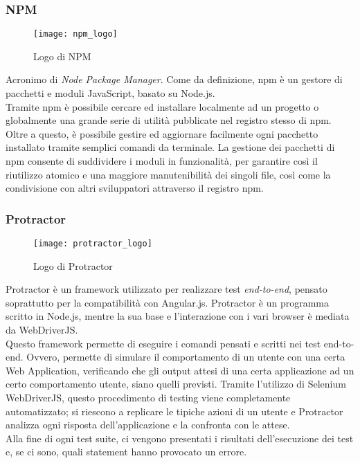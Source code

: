 \subsubsection{NPM}
\begin{figure}[htb] 
    \centering 
    \texttt{[image: npm\_logo]} 
    \caption{Logo di NPM}
\end{figure}
Acronimo di \emph{Node Package Manager}. Come da definizione, npm è un gestore di pacchetti e moduli JavaScript, basato su Node.js.\\ 
Tramite npm è possibile cercare ed installare localmente ad un progetto o globalmente una grande serie di utilità pubblicate nel registro stesso di npm. Oltre a questo, è possibile gestire ed aggiornare facilmente ogni pacchetto installato tramite semplici comandi da terminale.
La gestione dei pacchetti di npm consente di suddividere i moduli in funzionalità, per garantire così il riutilizzo atomico e una maggiore manutenibilità dei singoli file, così come la condivisione con altri sviluppatori attraverso il registro npm. 

\subsubsection{Protractor}
\begin{figure}[htb] 
    \centering 
    \texttt{[image: protractor\_logo]} 
    \caption{Logo di Protractor}
\end{figure}
Protractor è un framework utilizzato per realizzare test \emph{end-to-end}, pensato soprattutto per la compatibilità con Angular.js. Protractor è un programma scritto in Node.js, mentre la sua base e l’interazione con i vari browser è mediata da WebDriverJS.\\
Questo framework permette di eseguire i comandi pensati e scritti nei test end-to-end. Ovvero, permette di simulare il comportamento di un utente con una certa Web Application, verificando che gli output attesi di una certa applicazione ad un certo comportamento utente, siano quelli previsti. Tramite l’utilizzo di Selenium WebDriverJS, questo procedimento di testing viene completamente automatizzato; si riescono a replicare le tipiche azioni di un utente e Protractor analizza ogni risposta dell’applicazione e la confronta con le attese.\\
Alla fine di ogni test suite, ci vengono presentati i risultati dell’esecuzione dei test e, se ci sono, quali statement hanno provocato un errore.

